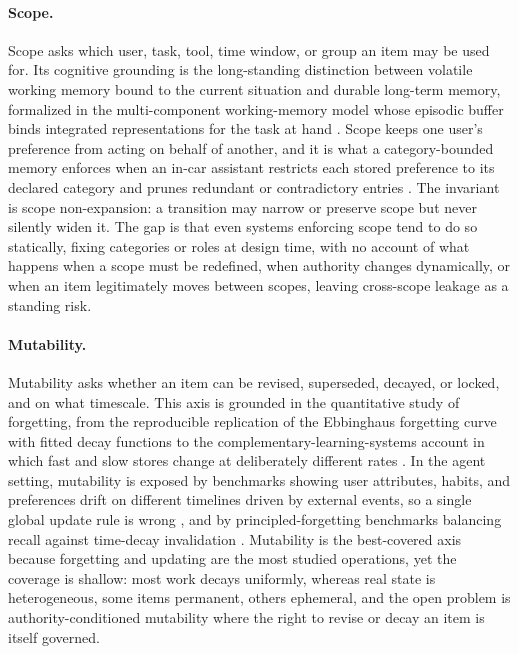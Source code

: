 \paragraph{Scope.} Scope asks which user, task, tool, time window, or group an item may be used for. Its cognitive grounding is the long-standing distinction between volatile working memory bound to the current situation and durable long-term memory, formalized in the multi-component working-memory model whose episodic buffer binds integrated representations for the task at hand \citep{baddeley2000episodic}. Scope keeps one user's preference from acting on behalf of another, and it is what a category-bounded memory enforces when an in-car assistant restricts each stored preference to its declared category and prunes redundant or contradictory entries \citep{kirmayr2025carmem}. The invariant is scope non-expansion: a transition may narrow or preserve scope but never silently widen it. The gap is that even systems enforcing scope tend to do so statically, fixing categories or roles at design time, with no account of what happens when a scope must be redefined, when authority changes dynamically, or when an item legitimately moves between scopes, leaving cross-scope leakage as a standing risk.

\paragraph{Mutability.} Mutability asks whether an item can be revised, superseded, decayed, or locked, and on what timescale. This axis is grounded in the quantitative study of forgetting, from the reproducible replication of the Ebbinghaus forgetting curve with fitted decay functions \citep{murre2015replication} to the complementary-learning-systems account in which fast and slow stores change at deliberately different rates \citep{mcclelland1995complementary}. In the agent setting, mutability is exposed by benchmarks showing user attributes, habits, and preferences drift on different timelines driven by external events, so a single global update rule is wrong \citep{xie2026dynamicmem}, and by principled-forgetting benchmarks balancing recall against time-decay invalidation \citep{uddin2026recallforgettingbenchmarkinglongterm}. Mutability is the best-covered axis because forgetting and updating are the most studied operations, yet the coverage is shallow: most work decays uniformly, whereas real state is heterogeneous, some items permanent, others ephemeral, and the open problem is authority-conditioned mutability where the right to revise or decay an item is itself governed.

